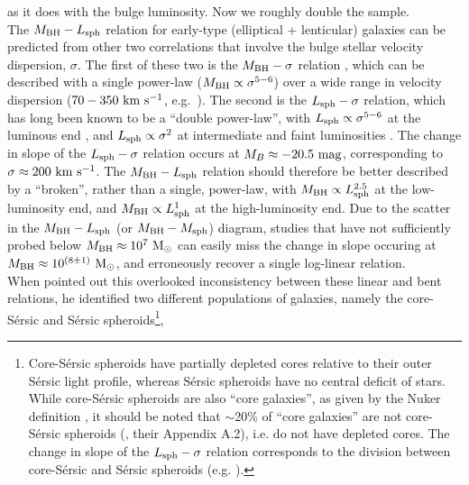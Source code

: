 \documentclass[preprint2]{emulateapj}
\begin{document}
as it does with the bulge luminosity. 
Now we roughly double the sample. \\
The $M_{\rm BH} - L_{\rm sph}$ relation for early-type (elliptical + lenticular) galaxies can be predicted from other two correlations that involve 
the bulge stellar velocity dispersion, $\sigma$.
The first of these two is the $M_{\rm BH} - \sigma$ relation \citep{ferraresemerritt2000,gebhardt2000},
which can be described with a single power-law ($M_{\rm BH} \propto \sigma^{5-6}$) 
over a wide range in velocity dispersion ($70-350~\rm km~s^{-1}$, e.g.~\citealt{graham2011,mcconnell2011,grahamscott2013}).
The second is the $L_{\rm sph} - \sigma$ relation, 
which has long been known to be a ``double power-law'', 
with $L_{\rm sph} \propto \sigma^{5-6}$ at the luminous end \citep{schechter1980,malumuthkrishner1981,vonderlinden2007,lauer2007lumell,liu2008}, 
and $L_{\rm sph} \propto \sigma^2$ at intermediate and faint luminosities 
\citep{davies1983,held1992,matkovicguzman2005,derijcke2005,balcells2007screl,chilingarian2008,forbes2008,cody2009,tortora2009,kourkchi2012}. 
The change in slope of the $L_{\rm sph} - \sigma$ relation occurs at $M_B \approx -20.5\rm~mag$, 
corresponding to $\sigma \approx 200~\rm km~s^{-1}$. 
The $M_{\rm BH} - L_{\rm sph}$ relation should therefore be better described by a ``broken'', rather than a single, power-law, 
with $M_{\rm BH} \propto L_{\rm sph}^{2.5}$ at the low-luminosity end, 
and $M_{\rm BH} \propto L_{\rm sph}^1$ at the high-luminosity end.  
Due to the scatter in the $M_{\rm BH} - L_{\rm sph}$ (or $M_{\rm BH} - M_{\rm sph}$) diagram, 
studies that have not sufficiently probed below $M_{\rm BH} \approx 10^7\rm~M_\odot$ 
can easily miss the change in slope occuring at $M_{\rm BH} \approx 10^{(8 \pm 1)}\rm~M_\odot$, 
and erroneously recover a single log-linear relation. \\
When \cite{graham2012bent} pointed out this overlooked inconsistency between these linear and bent relations, 
he identified two different populations of galaxies, 
namely the core-S\'ersic \citep{graham2003coresersicmodel,trujillo2004coresersicmodel} and S\'ersic 
spheroids\footnote{Core-S\'ersic spheroids have partially depleted cores relative to their outer S\'ersic light profile, 
whereas S\'ersic spheroids have no central deficit of stars. 
While core-S\'ersic spheroids are also ``core galaxies'', as given by the Nuker definition \citep{lauer2007lumell},
it should be noted that $\sim$20\% of ``core galaxies'' are not core-S\'ersic spheroids 
(\citealt{dullograham2014cores}, their Appendix A.2), i.e. do not have depleted cores.
The change in slope of the $L_{\rm sph} - \sigma$ relation corresponds to the division between 
core-S\'ersic and S\'ersic spheroids (e.g. \citealt{grahamguzman2003}).},
\end{document}
